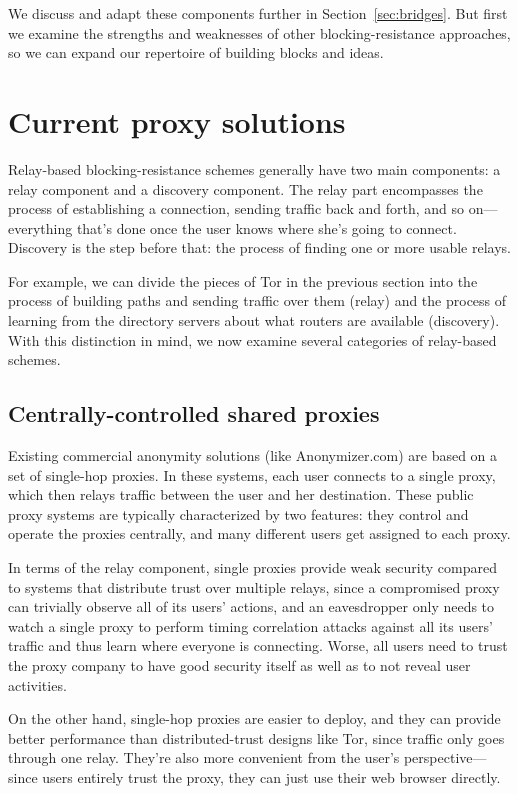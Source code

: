 \documentclass{llncs}
\begin{document}
We discuss and adapt these components further in
Section~\ref{sec:bridges}. But first we examine the strengths and
weaknesses of other blocking-resistance approaches, so we can expand
our repertoire of building blocks and ideas.

\section{Current proxy solutions}
\label{sec:related}

Relay-based blocking-resistance schemes generally have two main
components: a relay component and a discovery component. The relay part
encompasses the process of establishing a connection, sending traffic
back and forth, and so on---everything that's done once the user knows
where she's going to connect. Discovery is the step before that: the
process of finding one or more usable relays.

For example, we can divide the pieces of Tor in the previous section
into the process of building paths and sending
traffic over them (relay) and the process of learning from the directory
servers about what routers are available (discovery).  With this distinction
in mind, we now examine several categories of relay-based schemes.

\subsection{Centrally-controlled shared proxies}

Existing commercial anonymity solutions (like Anonymizer.com) are based
on a set of single-hop proxies. In these systems, each user connects to
a single proxy, which then relays traffic between the user and her
destination. These public proxy
systems are typically characterized by two features: they control and
operate the proxies centrally, and many different users get assigned
to each proxy.

In terms of the relay component, single proxies provide weak security
compared to systems that distribute trust over multiple relays, since a
compromised proxy can trivially observe all of its users' actions, and
an eavesdropper only needs to watch a single proxy to perform timing
correlation attacks against all its users' traffic and thus learn where
everyone is connecting. Worse, all users
need to trust the proxy company to have good security itself as well as
to not reveal user activities.

On the other hand, single-hop proxies are easier to deploy, and they
can provide better performance than distributed-trust designs like Tor,
since traffic only goes through one relay. They're also more convenient
from the user's perspective---since users entirely trust the proxy,
they can just use their web browser directly.
\end{document}
